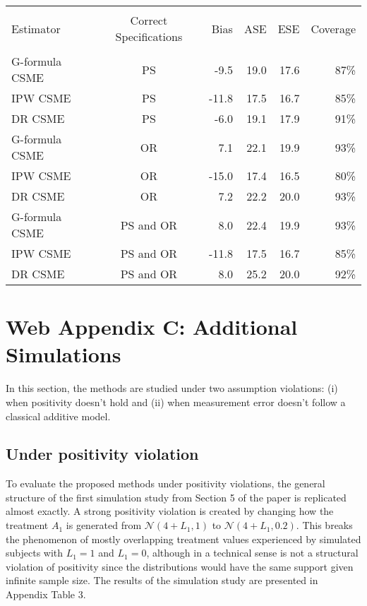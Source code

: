 \documentclass[12pt]{article}
\newcounter{tblcap}
\def\tblhead#1{\hline\\[-9pt]#1\\\hline\\[-9.75pt]}
\def\lastline{\\\hline}
\begin{document}
\begin{table}[h]
{\tabcolsep=6.25pt
\begin{tabular}{@{}lcrrrr@{}}
\tblhead{Estimator & Correct Specifications & Bias & ASE & ESE & Coverage}
G-formula CSME & PS & -9.5 & 19.0 & 17.6 & 87\% \\
IPW CSME & PS & -11.8 & 17.5 & 16.7 & 85\% \\
DR CSME & PS & -6.0 & 19.1 & 17.9 & 91\% \\[3pt]
G-formula CSME & OR & 7.1 & 22.1 & 19.9 & 93\% \\
IPW CSME & OR & -15.0 & 17.4 & 16.5 & 80\% \\
DR CSME & OR & 7.2 & 22.2 & 20.0 & 93\% \\[3pt]
G-formula CSME & PS and OR & 8.0 & 22.4 & 19.9 & 93\% \\
IPW CSME & PS and OR & -11.8 & 17.5 & 16.7 & 85\% \\
DR CSME & PS and OR & 8.0 & 25.2 & 20.0 & 92\%
\lastline
\end{tabular}}
\end{table}

\section{Web Appendix C: Additional Simulations}

In this section, the methods are studied under two assumption violations: (i) when positivity doesn't hold and (ii) when measurement error doesn't follow a classical additive model.

\subsection{Under positivity violation}

To evaluate the proposed methods under positivity violations, the general structure of the first simulation study from Section 5 of the paper is replicated almost exactly. A strong positivity violation is created by changing how the treatment $A_{1}$ is generated from $\mathcal{N}(4 + L_{1}, 1)$ to $\mathcal{N}(4 + L_{1}, 0.2)$. This breaks the phenomenon of mostly overlapping treatment values experienced by simulated subjects with $L_{1} = 1$ and $L_{1} = 0$, although in a technical sense is not a structural violation of positivity since the distributions would have the same support given infinite sample size. The results of the simulation study are presented in Appendix Table 3.
\end{document}
